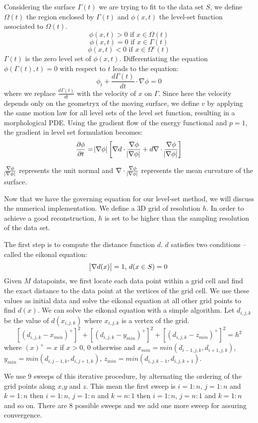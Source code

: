 \documentclass[a4paper]{article}
\begin{document}
Considering the surface $\Gamma(t)$ we are trying to fit to the data set $S$, we define $\Omega(t)$ the region enclosed by $\Gamma(t)$ and $\phi(x,t)$ the level-set function associated to $\Omega(t)$.
$$\phi(x,t) > 0\text{ if } x\in\Omega(t)$$
$$\phi(x,t) = 0\text{ if } x\in\Gamma(t)$$
$$\phi(x,t) < 0\text{ if } x\in\Omega^c(t)$$
$\Gamma(t)$ is the zero level set of $\phi(x,t)$. Differentiating the equation $\phi(\Gamma(t),t) = 0$ with respect to $t$ leads to the equation:
$$\phi_t + \frac{d\Gamma(t)}{dt}\cdot\nabla\phi = 0$$
where we replace $\frac{d\Gamma(t)}{dt}$ with the velocity of $x$ on $\Gamma$. Since here the velocity depends only on the geometryx of the moving surface, we define $v$ by applying the same motion law for all level sets of the level set function, resulting in a morphological PDE. Using the gradient flow of the energy functional and $p = 1$, the gradient in level set formulation becomes:
$$\frac{\partial\phi}{\partial t} = \abs{\nabla\phi}\left[\nabla d \cdot \frac{\nabla\phi}{\abs{\nabla\phi}} + d\nabla\cdot\frac{\nabla\phi}{\abs{\nabla\phi}}\right]$$

$\frac{\nabla\phi}{\abs{\nabla\phi}}$ represents the unit normal and $\nabla\cdot\frac{\nabla\phi}{\abs{\nabla\phi}}$ represents the mean curvature of the surface.

Now that we have the governing equation for our level-set method, we will discuss the numerical implementation. We define a 3D grid of resolution $h$. In order to achieve a good reconstruction, $h$ is set to be higher than the sampling resolution of the data set.

The first step is to compute the distance function $d$. $d$ satisfies two conditions -- called the eikonal equation:
$$\abs{\nabla d(x)} = 1\text{, }d(x\in S) = 0$$
Given $M$ datapoints, we first locate each data point within a grid cell and find the exact distance to the data point at the vertices of the grid cell. We use these values as initial data and solve the eikonal equation at all other grid points to find $d(x)$. We can solve the eikonal equation with a simple algorithm. Let $d_{i,j,k}$ be the value of $d(x_{i,j,k})$ where $x_{i,j,k}$ is a vertex of the grid.
$$[(d_{i,j,k} - x_{min})^+]^2 + [(d_{i,j,k} - y_{min})^+]^2 + [(d_{i,j,k} - z_{min})^+]^2 = h^2$$
where $(x)^+ = x$ if $x > 0$, $0$ otherwise and $x_{min} = min(d_{i-1,j,k}, d_{i+1,j,k})$, $y_{min} = min(d_{i,j-1,k}, d_{i,j+1,k})$, $z_{min} = min(d_{i,j,k-1}, d_{i,j,k+1})$.

We use 9 sweeps of this iterative procedure, by alternating the ordering of the grid points along $x$,$y$ and $z$. This mean the first sweep is $i=1:n$, $j=1:n$ and $k=1:n$ then $i=1:n$, $j=1:n$ and $k=n:1$ then $i=1:n$, $j=n:1$ and $k=1:n$ and so on. There are 8 possible sweeps and we add one more sweep for assuring convergence.
\end{document}
